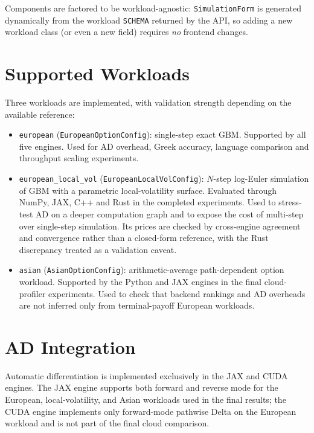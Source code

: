Components are factored to be workload-agnostic: \texttt{SimulationForm} is
generated dynamically from the workload \texttt{SCHEMA} returned by the API, so
adding a new workload class (or even a new field) requires \emph{no} frontend
changes.

\section{Supported Workloads}
\label{sec:impl-workloads}

Three workloads are implemented, with validation strength depending on the
available reference:

\begin{itemize}
    \item \texttt{european} (\texttt{EuropeanOptionConfig}): single-step exact
          GBM. Supported by all five engines. Used for AD overhead, Greek
          accuracy, language comparison and throughput scaling experiments.
    \item \texttt{european\_local\_vol} (\texttt{EuropeanLocalVolConfig}):
          $N$-step log-Euler simulation of GBM with a parametric
          local-volatility surface. Evaluated through NumPy, JAX, C++ and Rust
          in the completed experiments. Used to
          stress-test AD on a deeper computation graph and to expose the cost
          of multi-step over single-step simulation. Its prices are checked by
          cross-engine agreement and convergence rather than a closed-form
          reference, with the Rust discrepancy treated as a validation caveat.
    \item \texttt{asian} (\texttt{AsianOptionConfig}): arithmetic-average
          path-dependent option workload. Supported by the Python and JAX
          engines in the final cloud-profiler experiments. Used to check that
          backend rankings and AD overheads are not inferred only from
          terminal-payoff European workloads.
\end{itemize}

\section{AD Integration}
\label{sec:impl-ad}

Automatic differentiation is implemented exclusively in the JAX and CUDA
engines. The JAX engine supports both forward and reverse mode for the
European, local-volatility, and Asian workloads used in the final results; the
CUDA engine implements only forward-mode pathwise Delta on the European
workload and is not part of the final cloud comparison.


